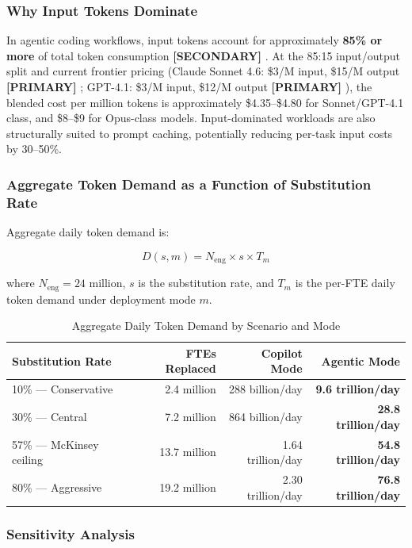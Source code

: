\documentclass{article}
\newcommand{\PRIMARY}{\textbf{[PRIMARY]}}
\newcommand{\SECONDARY}{\textbf{[SECONDARY]}}
\begin{document}
\subsubsection*{Why Input Tokens Dominate}

In agentic coding workflows, input tokens account for approximately \textbf{85\% or more}
of total token consumption \SECONDARY{} \citep{bai2026agent}. At the 85:15
input/output split and current frontier pricing (Claude Sonnet 4.6: \$3/M input, \$15/M
output \PRIMARY{} \citep{anthropic2025pricing}; GPT-4.1: \$3/M input, \$12/M output \PRIMARY{} \citep{openai2025pricing}), the blended cost per
million tokens is approximately \$4.35--\$4.80 for Sonnet/GPT-4.1 class, and \$8--\$9
for Opus-class models. Input-dominated workloads are also structurally suited to prompt
caching, potentially reducing per-task input costs by 30--50\%.

\subsubsection{Aggregate Token Demand as a Function of Substitution Rate}

Aggregate daily token demand is:

\[
D(s, m) = N_{\text{eng}} \times s \times T_m
\]

where $N_{\text{eng}} = 24$ million, $s$ is the substitution rate, and $T_m$ is the
per-FTE daily token demand under deployment mode $m$.

\begin{table}[ht]
\centering
\caption{Aggregate Daily Token Demand by Scenario and Mode}
\label{tab:token-demand}
\small
\begin{tabular}{@{}lrrr@{}}
\toprule
\textbf{Substitution Rate} & \textbf{FTEs Replaced} & \textbf{Copilot Mode} & \textbf{Agentic Mode} \\
\midrule
10\% --- Conservative & 2.4 million & 288 billion/day & \textbf{9.6 trillion/day} \\
30\% --- Central & 7.2 million & 864 billion/day & \textbf{28.8 trillion/day} \\
57\% --- McKinsey ceiling & 13.7 million & 1.64 trillion/day & \textbf{54.8 trillion/day} \\
80\% --- Aggressive & 19.2 million & 2.30 trillion/day & \textbf{76.8 trillion/day} \\
\bottomrule
\end{tabular}
\end{table}

\subsubsection{Sensitivity Analysis}
\end{document}
